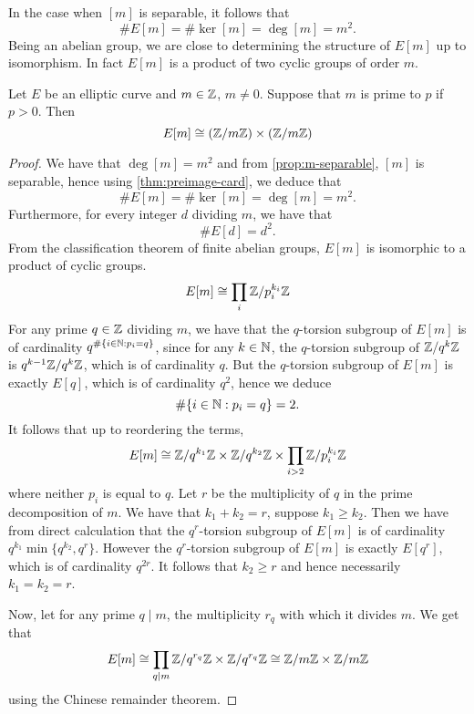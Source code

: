In the case when $[m]$ is separable, it follows that
\begin{equation*}
	\#E[m] = \#\ker[m] = \deg[m] = m^2.
\end{equation*}
Being an abelian group, we
are close to determining the structure of $E[m]$ up to isomorphism.
In fact $E[m]$ is a product of two cyclic groups of order $m$.

\begin{proposition}
	\label{prop:E-m-structure}
	Let $E$ be an elliptic curve and $m \in \mathbb{Z}$, $m \neq 0$.
	Suppose that $m$
	is prime to $p$ if $p > 0$. Then
	\begin{equation*}
		E[m] \cong (\mathbb{Z}/m\mathbb{Z})\times (\mathbb{Z}/m\mathbb{Z})
	\end{equation*}
\end{proposition}

\begin{proof}
	We have that $\deg[m] = m^2$ and
	from \ref{prop:m-separable}, $[m]$ is separable, hence
	using \ref{thm:preimage-card}, we deduce that
	\begin{equation*}
		\#E[m] = \#\ker[m] = \deg[m] = m^2.
	\end{equation*}
	Furthermore, for every integer $d$ dividing $m$, we have that
	\begin{equation*}
		\#E[d] = d^2.
	\end{equation*}
	From the classification theorem of finite abelian groups, $E[m]$ is
	isomorphic to a product of cyclic groups.
	\begin{equation*}
		E[m] \cong \prod_{i} \mathbb{Z}/p_i^{k_i}\mathbb{Z}
	\end{equation*}
	For any prime $q \in \mathbb{Z}$ dividing $m$,
	we have that the $q$-torsion subgroup of $E[m]$
	is of cardinality $q^{\#\{i \in \mathbb{N} : p_i = q\}}$, since for any
	$k \in \mathbb{N}$, the $q$-torsion subgroup of $\mathbb{Z}/q^k\mathbb{Z}$ is
	$q^{k-1}\mathbb{Z}/q^k\mathbb{Z}$, which is of cardinality $q$.
	But the $q$-torsion subgroup of $E[m]$ is exactly $E[q]$, which is
	of cardinality $q^2$, hence we deduce
	\begin{equation*}
		\#\{i \in \mathbb{N}: p_i = q\} = 2.
	\end{equation*}
	It follows that up to reordering the terms,
	\begin{equation*}
		E[m] \cong \mathbb{Z}/q^{k_1}\mathbb{Z} \times \mathbb{Z}/q^{k_2}\mathbb{Z} \times 
		\prod_{i > 2}\mathbb{Z}/p_i^{k_i}\mathbb{Z}
	\end{equation*}
	where neither $p_i$ is equal to $q$. Let $r$ be the multiplicity of
	$q$ in the prime decomposition of $m$. We have that $k_1 + k_2 = r$,
	suppose $k_1 \geq k_2$. Then we have from direct calculation that
	the $q^r$-torsion subgroup of $E[m]$ is of cardinality
	$q^{k_1}\min\{q^{k_2}, q^{r}\}$.
	However the $q^r$-torsion subgroup of $E[m]$ is exactly $E[q^r]$, which
	is of cardinality $q^{2r}$.
	It follows that $k_2 \geq r$ and hence necessarily $k_1 = k_2 = r$.
	
	Now, let for any prime $q \mid m$, the multiplicity $r_q$ with which
	it divides $m$. We get that
	\begin{equation*}
		E[m] \cong \prod_{q \mid m}\mathbb{Z}/q^{r_q}\mathbb{Z}\times \mathbb{Z}/q^{r_q}\mathbb{Z}
		\cong \mathbb{Z}/m\mathbb{Z}\times \mathbb{Z}/m\mathbb{Z}
	\end{equation*}
	using the Chinese remainder theorem.
\end{proof}

